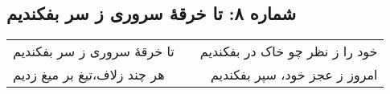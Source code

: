 \begin{center}
\section*{شماره ۸: تا خرقۀ سروری ز سر بفکندیم}
\label{sec:008}
\begin{longtable}{l p{0.5cm} r}
تا خرقهٔ سروری ز سر بفکندیم
&&
خود را ز نظر چو خاک در بفکندیم
\\
هر چند زلاف،‌تیغ بر میغ زدیم
&&
امروز ز عجز خود، سپر بفکندیم
\\
\end{longtable}
\end{center}
